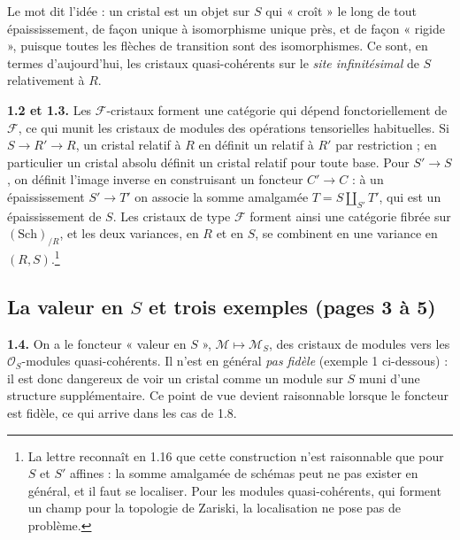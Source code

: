 \documentclass[11pt,a4paper]{article}
\begin{document}
Le mot dit l'idée : un cristal est un objet sur $S$ qui « croît » le long de
tout épaississement, de façon unique à isomorphisme unique près, et de façon
« rigide », puisque toutes les flèches de transition sont des isomorphismes.
Ce sont, en termes d'aujourd'hui, les cristaux quasi-cohérents sur le
\emph{site infinitésimal} de $S$ relativement à $R$.

\textbf{1.2 et 1.3.} Les $\mathcal{F}$-cristaux forment une catégorie qui
dépend fonctoriellement de $\mathcal{F}$, ce qui munit les cristaux de modules
des opérations tensorielles habituelles. Si $S \to R' \to R$, un cristal
relatif à $R$ en définit un relatif à $R'$ par restriction ; en particulier un
cristal absolu définit un cristal relatif pour toute base. Pour $S' \to S$, on
définit l'image inverse en construisant un foncteur $C' \to C$ : à un
épaississement $S' \to T'$ on associe la somme amalgamée
$T = S \amalg_{S'} T'$, qui est un épaississement de $S$. Les cristaux de type
$\mathcal{F}$ forment ainsi une catégorie fibrée sur $(\mathrm{Sch})_{/R}$,
et les deux variances, en $R$ et en $S$, se combinent en une variance en
$(R,S)$.\footnote{La lettre reconnaît en 1.16 que cette construction n'est
raisonnable que pour $S$ et $S'$ affines : la somme amalgamée de schémas
peut ne pas exister en général, et il faut se localiser. Pour les modules
quasi-cohérents, qui forment un champ pour la topologie de Zariski, la
localisation ne pose pas de problème.}

\subsection*{La valeur en $S$ et trois exemples (pages 3 à 5)}

\textbf{1.4.} On a le foncteur « valeur en $S$ », $\mathcal{M} \mapsto
\mathcal{M}_S$, des cristaux de modules vers les $\mathcal{O}_S$-modules
quasi-cohérents. Il n'est en général \emph{pas fidèle} (exemple 1 ci-dessous) :
il est donc dangereux de voir un cristal comme un module sur $S$ muni d'une
structure supplémentaire. Ce point de vue devient raisonnable lorsque le
foncteur est fidèle, ce qui arrive dans les cas de 1.8.
\end{document}
